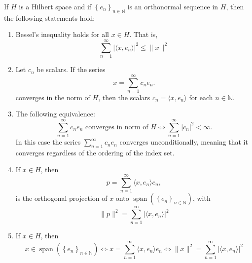 \documentclass[../thesis.tex]{subfiles}
\begin{document}
\begin{theorem}\label{thrm:orthog_proj_formula_and_facts}
    If $H$ is a Hilbert space and if $\left\{ e_{n} \right\}_{n\in \mathbb{N}}$ is an orthonormal sequence in $H$,  then the following statements hold:
    \begin{enumerate}[label=(\alph*)]
        \item \label{eq:opfaf_a} Bessel's inequality holds for all $x \in H$. That is, 
        \begin{equation}
            \sum_{n=1}^{\infty} \left| \langle x, e_n \rangle \right|^2 \leq \| x\|^2 
        \end{equation}
        
        \item \label{eq:opfaf:b} Let $c_n$ be scalars. If the series $$ x=\sum_{n=1}^\infty c_n e_n.$$ converges in the norm of $H$, then the scalars $c_n= \langle x, e_n\rangle$ for each $n \in \mathbb{N}$.
        
        \item \label{eq:opfaf_c} The following equivalence: 
        \begin{equation}
            \sum_{n=1}^{\infty} c_n e_n \text{ converges in norm of } H \Longleftrightarrow \sum_{n=1}^{\infty} \left| c_n \right|^2 < \infty.
        \end{equation}
        In this case the series $\sum_{n=1}^{\infty} c_n e_n$ converges unconditionally, meaning that it converges regardless of the ordering of the index set.
        
        \item \label{eq:opfaf_d} If $x \in H$, then 
        \begin{equation} 
            p= \sum_{n=1}^{\infty} \langle x, e_n \rangle e_n, 
        \end{equation} 
        is the orthogonal projection of $x$ onto  $\overline{\operatorname{span}} \left( \left\{ e_{n} \right\}_{n\in \mathbb{N}} \right) $, with
        \begin{equation}
            \| p\|^2 = \sum_{n=1}^{\infty} \left| \langle x,e_n \rangle \right|^2
        \end{equation}
        
        \item \label{eq:opfaf_e} If $x \in H$, then 
        \begin{equation}
            x\in \overline{\operatorname{span}} \left( \left\{ e_{n} \right\}_{n\in \mathbb{N}} \right) \Longleftrightarrow x=\sum_{n=1}^{\infty} \langle x, e_n \rangle e_n \Longleftrightarrow \| x\|^2 = \sum_{n=1}^{\infty} \left| \langle x,e_n\rangle \right|^2
        \end{equation}
    \end{enumerate}
\end{theorem}
\end{document}
